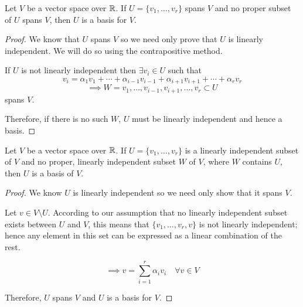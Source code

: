 \documentclass[a4paper,10pt]{article}
\begin{document}
\begin{thm}
	Let $V$ be a vector space over $\mathbb{R}$. If $U = \{v_1, \ldots,
	v_r\}$ spans $V$ and no proper subset of $U$ spans $V$, then $U$
	is a basis for $V$.
\end{thm}

\begin{proof}
	We know that $U$ spans $V$ so we need only prove that $U$ is linearly independent. We will do so using the contrapositive method.

	If $U$ is not linearly independent then $\exists v_i \in U$ such that
	\[
		v_i = \alpha_1 v_1 + \cdots + \alpha_{i-1} v_{i-1} +
		\alpha_{i+1} v_{i+1} + \cdots + \alpha_r v_r
	\]
	\[
		\implies
		W = {v_1, \ldots, v_{i-1}, v_{i+1}, \ldots, v_r}
		\subset U
	\]
	spans $V$.

	Therefore, if there is no such $W$, $U$ must be linearly
	independent and hence a basis.
\end{proof}

\begin{thm}
	Let $V$ be a vector space over $\mathbb{R}$. If $U = \{v_1, \ldots, v_r\}$
	is a linearly independent subset of $V$ and no proper, linearly
	independent  subset $W$ of $V$, where $W$ contains $U$, then $U$
	is a basis of $V$.
\end{thm}

\begin{proof}
	We know $U$ is linearly independent so we need only show that it
	spans $V$.

	Let $v \in V \setminus U$. According to our assumption that no
	linearly independent subset exists between $U$ and $V$, this
	means that $\{v_1, \ldots, v_r, v\}$ is  not linearly
	independent; hence any element in this set can be expressed as a
	linear combination of the rest.

	\[
		\implies
		v = \sum_{i=1}^r \alpha_i v_i \quad \forall v \in V
	\]

	Therefore, $U$ spans $V$ and $U$ is a basis for $V$.
\end{proof}
\end{document}
